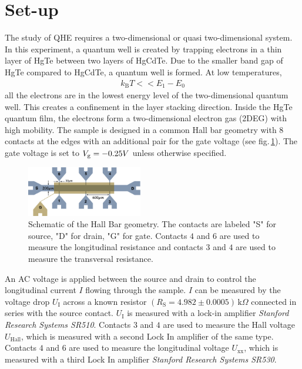 \section{Set-up}\label{sec:setup}
The study of QHE requires a two-dimensional or quasi two-dimensional system.
In this experiment, a quantum well is created by trapping electrons in a thin layer of HgTe between two layers of HgCdTe. Due to the smaller band gap of HgTe compared to HgCdTe, a quantum well is formed. 
At low temperatures, 
\begin{align}
    k_\text{B}T << E_1-E_0
\end{align}
all the electrons are in the lowest energy level of the two-dimensional quantum well. This creates a confinement in the layer stacking direction.
Inside the HgTe quantum film, the electrons form a two-dimensional electron gas (2DEG) with high mobility.
The sample is designed in a common Hall bar geometry with $8$ contacts at the edges with an additional pair for the gate voltage (see fig.\,\ref{fig:HallBar}).
The gate voltage is set to $V_\text g = -0.25V$ unless otherwise specified.
\begin{figure}[h]
    \centering
    \includegraphics[width=0.45\textwidth]{../Images/HallBar.png}
    \caption{Schematic of the Hall Bar geometry. The contacts are labeled "S" 
    for source, "D" for drain, "G" for gate. Contacts $4$ and $6$ are used to 
    measure the longitudinal resistance and contacts $3$ and $4$ are used to measure 
    the transversal resistance.}
    \label{fig:HallBar}
\end{figure}
An AC voltage is applied between the source and drain to control the longitudinal current $I$ flowing through the sample. 
$I$ can be measured by the voltage drop $U_\text{I}$ across a known resistor 
$(R_\text{S}=4.982\pm0.0005)\,\text{k}\Omega$ connected in series with the source contact. 
$U_\text{I}$ is measured with a lock-in amplifier \emph{Stanford Research Systems SR510}. 
Contacts $3$ and $4$ are used to measure the Hall voltage $U_\text{Hall}$, which is measured with a second Lock In amplifier of the same type. 
Contacts $4$ and $6$ are used to measure the longitudinal voltage $U_\text{xx}$, which is measured with a third Lock In amplifier \emph{Stanford Research Systems SR530}.
